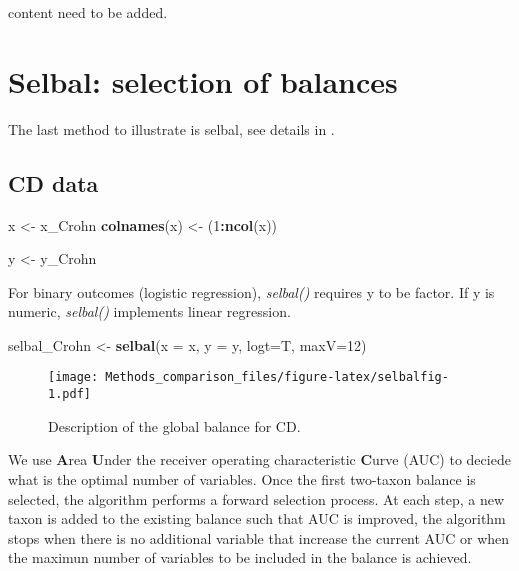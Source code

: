 \documentclass[]{book}
\newenvironment{Shaded}{\begin{snugshade}}{\end{snugshade}}
\newcommand{\KeywordTok}[1]{\textcolor[rgb]{0.13,0.29,0.53}{\textbf{#1}}}
\newcommand{\DataTypeTok}[1]{\textcolor[rgb]{0.13,0.29,0.53}{#1}}
\newcommand{\DecValTok}[1]{\textcolor[rgb]{0.00,0.00,0.81}{#1}}
\newcommand{\StringTok}[1]{\textcolor[rgb]{0.31,0.60,0.02}{#1}}
\newcommand{\OperatorTok}[1]{\textcolor[rgb]{0.81,0.36,0.00}{\textbf{#1}}}
\newcommand{\NormalTok}[1]{#1}
\begin{document}
content need to be added.

\chapter{Selbal: selection of balances}\label{selbal}

The last method to illustrate is selbal, see details in
\citep{rivera2018balances}.

\section{CD data}\label{cd-data-2}

\begin{Shaded}
\begin{Highlighting}[]
\NormalTok{x <-}\StringTok{ }\NormalTok{x_Crohn }
\KeywordTok{colnames}\NormalTok{(x) <-}\StringTok{ }\NormalTok{(}\DecValTok{1}\OperatorTok{:}\KeywordTok{ncol}\NormalTok{(x))}

\NormalTok{y <-}\StringTok{ }\NormalTok{y_Crohn  }
\end{Highlighting}
\end{Shaded}

For binary outcomes (logistic regression), \emph{selbal()} requires y to
be factor. If y is numeric, \emph{selbal()} implements linear
regression.

\begin{Shaded}
\begin{Highlighting}[]
\NormalTok{selbal_Crohn <-}\StringTok{ }\KeywordTok{selbal}\NormalTok{(}\DataTypeTok{x =}\NormalTok{ x, }\DataTypeTok{y =}\NormalTok{ y, }\DataTypeTok{logt=}\NormalTok{T, }\DataTypeTok{maxV=}\DecValTok{12}\NormalTok{)}
\end{Highlighting}
\end{Shaded}

\begin{figure}
\centering
\texttt{[image: Methods\_comparison\_files/figure-latex/selbalfig-1.pdf]}
\caption{\label{fig:selbalfig}Description of the global balance for CD.}
\end{figure}

We use \textbf{A}rea \textbf{U}nder the receiver operating
characteristic \textbf{C}urve (AUC) to deciede what is the optimal
number of variables. Once the first two-taxon balance is selected, the
algorithm performs a forward selection process. At each step, a new
taxon is added to the existing balance such that AUC is improved, the
algorithm stops when there is no additional variable that increase the
current AUC or when the maximun number of variables to be included in
the balance is achieved.
\end{document}
